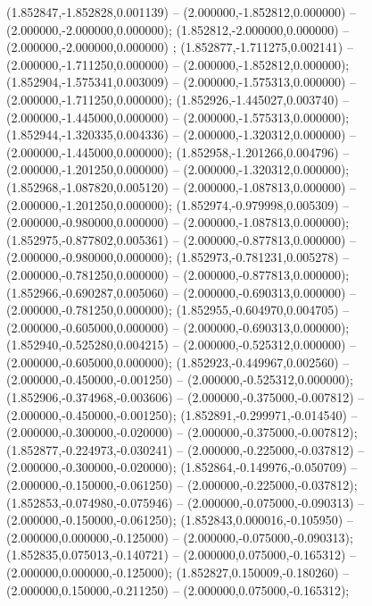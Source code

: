  (1.852847,-1.852828,0.001139) -- (2.000000,-1.852812,0.000000) -- (2.000000,-2.000000,0.000000);
 (1.852812,-2.000000,0.000000) -- (2.000000,-2.000000,0.000000) ;
 (1.852877,-1.711275,0.002141) -- (2.000000,-1.711250,0.000000) -- (2.000000,-1.852812,0.000000);
 (1.852904,-1.575341,0.003009) -- (2.000000,-1.575313,0.000000) -- (2.000000,-1.711250,0.000000);
 (1.852926,-1.445027,0.003740) -- (2.000000,-1.445000,0.000000) -- (2.000000,-1.575313,0.000000);
 (1.852944,-1.320335,0.004336) -- (2.000000,-1.320312,0.000000) -- (2.000000,-1.445000,0.000000);
 (1.852958,-1.201266,0.004796) -- (2.000000,-1.201250,0.000000) -- (2.000000,-1.320312,0.000000);
 (1.852968,-1.087820,0.005120) -- (2.000000,-1.087813,0.000000) -- (2.000000,-1.201250,0.000000);
 (1.852974,-0.979998,0.005309) -- (2.000000,-0.980000,0.000000) -- (2.000000,-1.087813,0.000000);
 (1.852975,-0.877802,0.005361) -- (2.000000,-0.877813,0.000000) -- (2.000000,-0.980000,0.000000);
 (1.852973,-0.781231,0.005278) -- (2.000000,-0.781250,0.000000) -- (2.000000,-0.877813,0.000000);
 (1.852966,-0.690287,0.005060) -- (2.000000,-0.690313,0.000000) -- (2.000000,-0.781250,0.000000);
 (1.852955,-0.604970,0.004705) -- (2.000000,-0.605000,0.000000) -- (2.000000,-0.690313,0.000000);
 (1.852940,-0.525280,0.004215) -- (2.000000,-0.525312,0.000000) -- (2.000000,-0.605000,0.000000);
 (1.852923,-0.449967,0.002560) -- (2.000000,-0.450000,-0.001250) -- (2.000000,-0.525312,0.000000);
 (1.852906,-0.374968,-0.003606) -- (2.000000,-0.375000,-0.007812) -- (2.000000,-0.450000,-0.001250);
 (1.852891,-0.299971,-0.014540) -- (2.000000,-0.300000,-0.020000) -- (2.000000,-0.375000,-0.007812);
 (1.852877,-0.224973,-0.030241) -- (2.000000,-0.225000,-0.037812) -- (2.000000,-0.300000,-0.020000);
 (1.852864,-0.149976,-0.050709) -- (2.000000,-0.150000,-0.061250) -- (2.000000,-0.225000,-0.037812);
 (1.852853,-0.074980,-0.075946) -- (2.000000,-0.075000,-0.090313) -- (2.000000,-0.150000,-0.061250);
 (1.852843,0.000016,-0.105950) -- (2.000000,0.000000,-0.125000) -- (2.000000,-0.075000,-0.090313);
 (1.852835,0.075013,-0.140721) -- (2.000000,0.075000,-0.165312) -- (2.000000,0.000000,-0.125000);
 (1.852827,0.150009,-0.180260) -- (2.000000,0.150000,-0.211250) -- (2.000000,0.075000,-0.165312);
